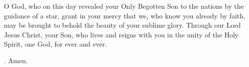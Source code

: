 \lettrine[lines=3]{O}{} God, who on this day
revealed your Only Begotten Son to the nations
by the guidance of a star,
grant in your mercy
that we, who know you already by faith,
may be brought to behold the beauty of your sublime glory.
Through our Lord Jesus Christ, your Son,
who lives and reigns with you in the unity of the Holy Spirit,
one God, for ever and ever. \par \Rbar. Amen. 
